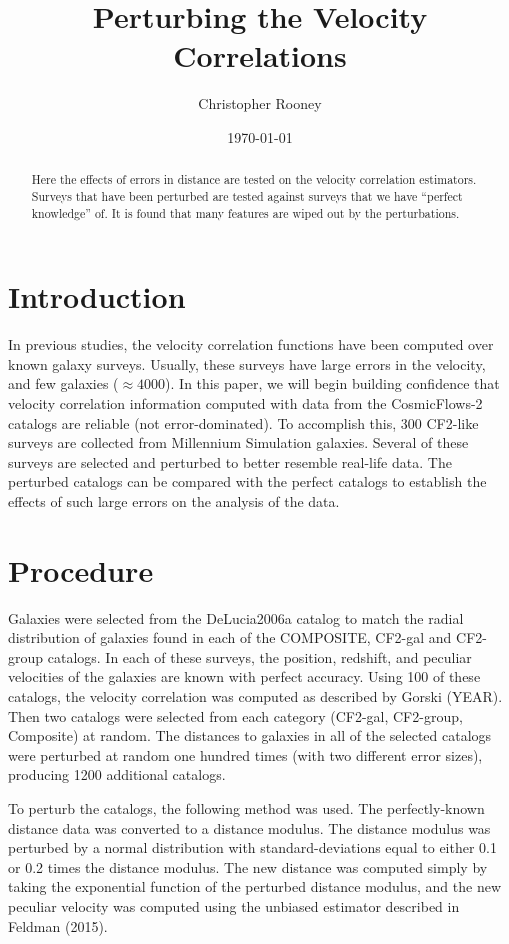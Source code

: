 \documentclass[usenatbib]{mn2e}
\begin{document}
\author{Christopher Rooney}
\date{\today}
\title{Perturbing the Velocity Correlations}
\maketitle

\begin{abstract}
Here the effects of errors in distance are tested on the velocity correlation estimators. Surveys that have been perturbed are tested against surveys that we have ``perfect knowledge'' of. It is found that many features are wiped out by the perturbations.
\end{abstract}

\section{Introduction}
In previous studies, the velocity correlation functions have been computed over known galaxy surveys. Usually, these surveys have large errors in the velocity, and few galaxies ($\approx 4000$). In this paper, we will begin building confidence that velocity correlation information computed with data from the CosmicFlows-2 catalogs are reliable (not error-dominated). To accomplish this, 300 CF2-like surveys are collected from Millennium Simulation galaxies. Several of these surveys are selected and perturbed to better resemble real-life data. The perturbed catalogs can be compared with the perfect catalogs to establish the effects of such large errors on the analysis of the data.

\section{Procedure}
Galaxies were selected from the DeLucia2006a catalog to match the radial distribution of galaxies found in each of the COMPOSITE, CF2-gal and CF2-group catalogs. In each of these surveys, the position, redshift, and peculiar velocities of the galaxies are known with perfect accuracy. Using 100 of these catalogs, the velocity correlation was computed as described by Gorski (YEAR). Then two catalogs were selected from each category (CF2-gal, CF2-group, Composite) at random. The distances to galaxies in all of the selected catalogs were perturbed at random one hundred times (with two different error sizes), producing 1200 additional catalogs. 

To perturb the catalogs, the following method was used. The perfectly-known distance data was converted to a distance modulus. The distance modulus was perturbed by a normal distribution with standard-deviations equal to either 0.1 or 0.2 times the distance modulus. The new distance was computed simply by taking the exponential function of the perturbed distance modulus, and the new peculiar velocity was computed using the unbiased estimator described in Feldman (2015).
\end{document}
